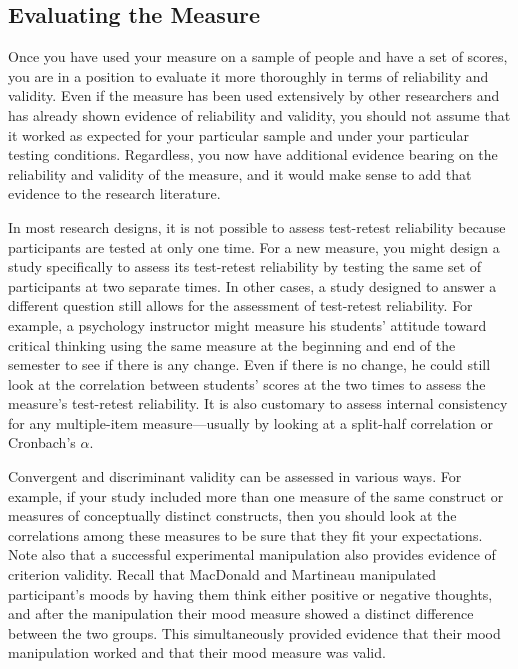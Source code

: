 \subsection{Evaluating the Measure}

Once you have used your measure on a sample of people and have a set of scores, you are in a position to evaluate it more thoroughly in terms of reliability and validity. Even if the measure has been used extensively by other researchers and has already shown evidence of reliability and validity, you should not assume that it worked as expected for your particular sample and under your particular testing conditions. Regardless, you now have additional evidence bearing on the reliability and validity of the measure, and it would make sense to add that evidence to the research literature.

In most research designs, it is not possible to assess test-retest reliability because participants are tested at only one time. For a new measure, you might design a study specifically to assess its test-retest reliability by testing the same set of participants at two separate times. In other cases, a study designed to answer a different question still allows for the assessment of test-retest reliability. For example, a psychology instructor might measure his students' attitude toward critical thinking using the same measure at the beginning and end of the semester to see if there is any change. Even if there is no change, he could still look at the correlation between students' scores at the two times to assess the measure's test-retest reliability. It is also customary to assess internal consistency for any multiple-item measure—usually by looking at a split-half correlation or Cronbach's $\alpha$.

Convergent and discriminant validity can be assessed in various ways. For example, if your study included more than one measure of the same construct or measures of conceptually distinct constructs, then you should look at the correlations among these measures to be sure that they fit your expectations. Note also that a successful experimental manipulation also provides evidence of criterion validity. Recall that MacDonald and Martineau manipulated participant's moods by having them think either positive or negative thoughts, and after the manipulation their mood measure showed a distinct difference between the two groups. This simultaneously provided evidence that their mood manipulation worked and that their mood measure was valid.

